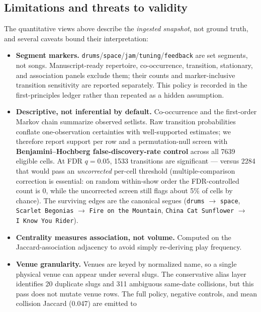 \documentclass[
]{article}
\providecommand{\tightlist}{%
  \setlength{\itemsep}{0pt}\setlength{\parskip}{0pt}}
\begin{document}
\subsection{Limitations and threats to
validity}\label{limitations-and-threats-to-validity}

The quantitative views above describe the \emph{ingested snapshot}, not
ground truth, and several caveats bound their interpretation:

\begin{itemize}
\tightlist
\item
  \textbf{Segment markers.}
  \texttt{drums}/\texttt{space}/\texttt{jam}/\texttt{tuning}/\texttt{feedback}
  are set segments, not songs. Manuscript-ready repertoire,
  co-occurrence, transition, stationary, and association panels exclude
  them; their counts and marker-inclusive transition sensitivity are
  reported separately. This policy is recorded in the first-principles
  ledger rather than repeated as a hidden assumption.
\item
  \textbf{Descriptive, not inferential by default.} Co-occurrence and
  the first-order Markov chain summarize observed setlists. Raw
  transition probabilities conflate one-observation certainties with
  well-supported estimates; we therefore report support per row and a
  permutation-null screen with \textbf{Benjamini--Hochberg
  false-discovery-rate control} across all 7639 eligible cells. At FDR
  \(q=0.05\), 1533 transitions are significant --- versus 2284 that
  would pass an \emph{uncorrected} per-cell threshold
  (multiple-comparison correction is essential: on random within-show
  order the FDR-controlled count is \(0\), while the uncorrected screen
  still flags about 5\% of cells by chance). The surviving
  edges are the canonical segues (\texttt{drums} \(\to\) \texttt{space},
  \texttt{Scarlet\ Begonias} \(\to\) \texttt{Fire\ on\ the\ Mountain},
  \texttt{China\ Cat\ Sunflower} \(\to\) \texttt{I\ Know\ You\ Rider}).
\item
  \textbf{Centrality measures association, not volume.} Computed on the
  Jaccard-association adjacency to avoid simply re-deriving play
  frequency.
\item
  \textbf{Venue granularity.} Venues are keyed by normalized name, so a
  single physical venue can appear under several slugs. The conservative
  alias layer identifies 20 duplicate slugs and 311 ambiguous same-date
  collisions, but this pass does not mutate venue rows. The full policy,
  negative controls, and mean collision Jaccard (0.047) are emitted to

\end{itemize}
\end{document}
